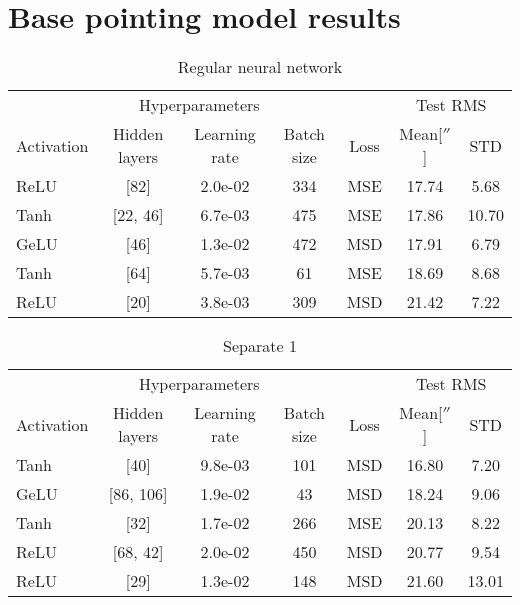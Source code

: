\section{Base pointing model results}
\begin{table}[!htbp]
    \centering
    \caption{Regular neural network}
    \begin{tabular}{lcccccc}
        \toprule
        \multicolumn{5}{c}{Hyperparameters} & \multicolumn{2}{c}{Test RMS} \\
        \cmidrule(lr){1-5} \cmidrule(lr){6-7}
        Activation & Hidden layers & Learning rate & Batch size & Loss & Mean[$''$] & STD\\
        \midrule
        ReLU &        [82] &       2.0e-02 &        334 & MSE &    17.74 &  5.68 \\
        Tanh &    [22, 46] &       6.7e-03 &        475 & MSE &    17.86 & 10.70 \\
        GeLU &        [46] &       1.3e-02 &        472 & MSD &    17.91 &  6.79 \\
        Tanh &        [64] &       5.7e-03 &         61 & MSE &    18.69 &  8.68 \\
        ReLU &        [20] &       3.8e-03 &        309 & MSD &    21.42 &  7.22 \\
  \bottomrule
    \end{tabular}
\end{table}

\begin{table}[!htbp]
    \centering
    \caption{Separate 1}
    \begin{tabular}{lcccccc}
        \toprule
        \multicolumn{5}{c}{Hyperparameters} & \multicolumn{2}{c}{Test RMS} \\
        \cmidrule(lr){1-5} \cmidrule(lr){6-7}
        Activation & Hidden layers & Learning rate & Batch size & Loss & Mean[$''$] & STD \\
        \midrule
        Tanh &        [40] &       9.8e-03 &        101 & MSD &    16.80 &  7.20 \\
        GeLU &   [86, 106] &       1.9e-02 &         43 & MSD &    18.24 &  9.06 \\
        Tanh &        [32] &       1.7e-02 &        266 & MSE &    20.13 &  8.22 \\
        ReLU &    [68, 42] &       2.0e-02 &        450 & MSD &    20.77 &  9.54 \\
        ReLU &        [29] &       1.3e-02 &        148 & MSD &    21.60 & 13.01 \\
  \bottomrule
    \end{tabular}
\end{table}

